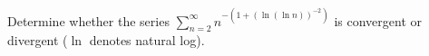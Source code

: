 Determine whether the series $\displaystyle \sum_{n=2}^{\infty} n^{-(1+(\ln(\ln
n))^{-2})}$ is convergent or divergent ($\ln$ denotes natural log).
